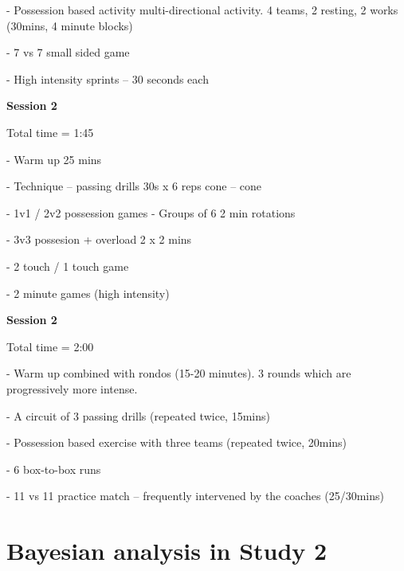 \documentclass[
  english,
  man,floatsintext]{apa6}
\begin{document}
\begin{flushleft}
- Possession based activity multi-directional activity. 4 teams, 2 resting, 2 works (30mins, 4 minute blocks)

- 7 vs 7 small sided game

- High intensity sprints – 30 seconds each

\textbf{Session 2}

Total time = 1:45

- Warm up 25 mins

- Technique – passing drills 30s x 6 reps cone – cone

- 1v1 / 2v2 possession games - Groups of 6 2 min rotations

- 3v3 possesion + overload 2 x 2 mins

- 2 touch / 1 touch game

- 2 minute games (high intensity)


\textbf{Session 2}

Total time = 2:00

- Warm up combined with rondos (15-20 minutes). 3 rounds which are progressively more intense.

- A circuit of 3 passing drills (repeated twice, 15mins)

- Possession based exercise with three teams (repeated twice, 20mins)

- 6 box-to-box runs

- 11 vs 11 practice match – frequently intervened by the coaches (25/30mins)

\end{flushleft}

\section{Bayesian analysis in Study 2}

\end{document}
